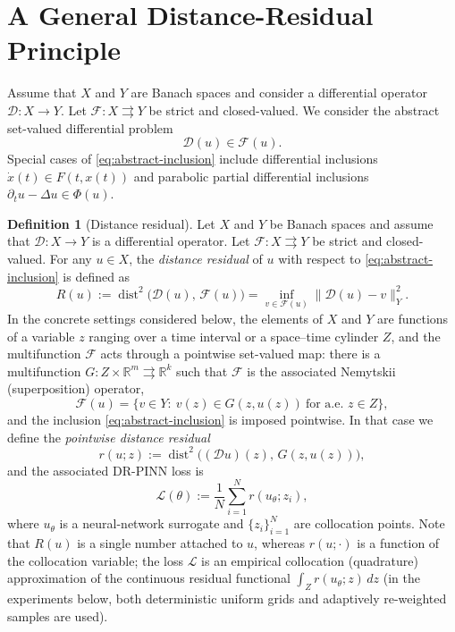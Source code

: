 \documentclass[11pt]{elsarticle}
\theoremstyle{definition}
\newtheorem{definition}[theorem]{Definition}
\theoremstyle{remark}
\numberwithin{equation}{section}
\def\dist{\operatorname{dist}}
\begin{document}
	\section{A General Distance-Residual Principle}
	\label{sec:principle}
	
	Assume that $X$ and $Y$ are Banach spaces and consider a differential operator $\mathcal{D}:X\to Y$. Let $\mathcal{F}:X\rightrightarrows Y$ be strict and closed-valued. We consider the abstract
	set-valued differential problem
	\begin{equation}\label{eq:abstract-inclusion}
		\mathcal{D}(u)\in\mathcal{F}(u).
	\end{equation}
	Special cases of \eqref{eq:abstract-inclusion} include differential
	inclusions $\dot{x}(t)\in F(t,x(t))$ and parabolic partial differential
	inclusions $\partial_t u-\Delta u\in\Phi(u)$.
	
	\begin{definition}[Distance residual]
		Let $X$ and $Y$ be Banach spaces and assume that $\mathcal{D}:X\to Y$ is a differential operator. Let $\mathcal{F}:X\rightrightarrows Y$ be strict and
		closed-valued.
		For any $u\in X$, the \emph{distance residual} of $u$ with respect to
		\eqref{eq:abstract-inclusion} is defined as
		\[
		R(u):=\dist^2\bigl(\mathcal{D}(u),\,\mathcal{F}(u)\bigr)
		= \inf_{v\in \mathcal{F}(u)} \|\mathcal{D}(u) - v \|_Y^2.
		\]
		In the concrete settings considered below, the elements of $X$ and
		$Y$ are functions of a variable $z$ ranging over a time interval or a
		space--time cylinder $Z$, and the multifunction $\mathcal{F}$ acts
		through a pointwise set-valued map: there is a multifunction
		$G:Z\times\mathbb{R}^m\rightrightarrows\mathbb{R}^k$ such that
		$\mathcal{F}$ is the associated Nemytskii (superposition) operator,
		\[
		\mathcal{F}(u)
		=
		\bigl\{v\in Y:\ v(z)\in G(z,u(z))\ \text{for a.e. } z\in Z\bigr\},
		\]
		and the inclusion \eqref{eq:abstract-inclusion} is imposed pointwise.
		In that case we define the \emph{pointwise distance residual}
		\[
		r(u;z)
		:=
		\dist^2\bigl((\mathcal{D}u)(z),\,G(z,u(z))\bigr),
		\]
		and the associated DR-PINN loss is
		\[
		\mathcal{L}(\theta)
		:=
		\frac{1}{N}\sum_{i=1}^{N} r(u_\theta;z_i),
		\]
		where $u_\theta$ is a neural-network surrogate and $\{z_i\}_{i=1}^N$ are
		collocation points. Note that $R(u)$ is a single number attached to $u$,
		whereas $r(u;\cdot)$ is a function of the collocation variable; the loss
		$\mathcal{L}$ is an empirical collocation (quadrature) approximation of
		the continuous residual functional $\int_Z r(u_\theta;z)\,dz$
		(in the experiments below, both deterministic uniform grids and
		adaptively re-weighted samples are used).
	\end{definition}
\end{document}
